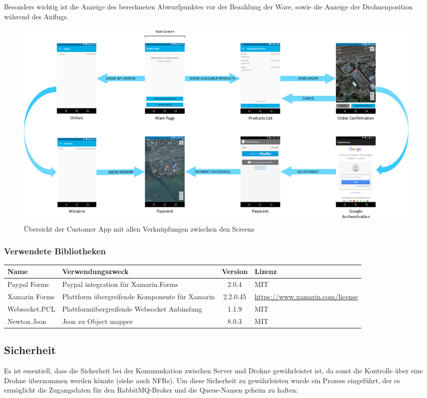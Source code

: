 Besonders wichtig ist die Anzeige des berechneten Abwurfpunktes vor der Bezahlung der Ware, sowie die Anzeige der Drohnenposition während des Anflugs.  

\begin{landscape}
	\begin{figure}[h]
		\centering
		\includegraphics[width=0.8\paperheight] {images/customer-app-pages.png}
		\caption{Übersicht der Customer App mit allen Verknüpfungen zwischen den Screens}
		\label{fig:customer-app-flow}
	\end{figure}
\end{landscape}

\subsubsection{Verwendete Bibliotheken}
\begin{tabularx}{\textwidth}{|X|X|c|X|}
	\hline
	\textbf{Name} & \textbf{Verwendungszweck} & \textbf{Version} & \textbf{Lizenz} \\
	\hline \hline
	Paypal Forms & Paypal integration für Xamarin.Forms & 2.0.4 & MIT \\
	\hline 
	Xamarin Forms & Plattform übergreifende Komponente für Xamarin & 2.2.0.45 & \url{https://www.xamarin.com/license} \\
	\hline 
	Websocket.PCL & Plattformübergreifende Websocket Anbindung & 1.1.9 & MIT \\
	\hline 
	Newton.Json & Json zu Object mapper & 8.0.3 & MIT \\
	\hline 
\end{tabularx}

\subsection{Sicherheit}
Es ist essentiell, dass die Sicherheit bei der Kommunkation zwischen Server und Drohne gewährleistet ist, da sonst die Kontrolle über eine Drohne übernommen werden könnte (siehe auch NFRs). Um diese Sicherheit zu gewährleisten wurde ein Prozess eingeführt, der es ermöglicht die Zugangsdaten für den RabbitMQ-Broker und die Queue-Namen geheim zu halten: \\

